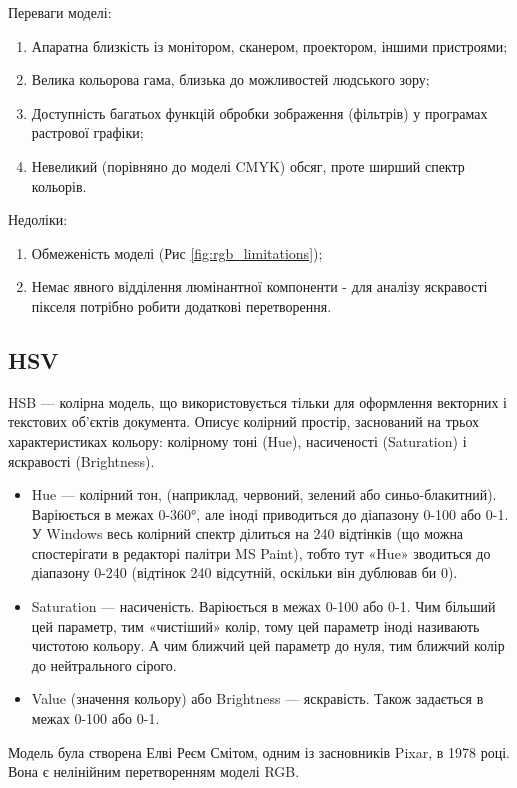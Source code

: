 Переваги моделі:
\begin{enumerate}
	\item Апаратна близкість із монітором, сканером, проектором, іншими пристроями;
	\item Велика кольорова гама, близька до можливостей людського зору;
	\item Доступність багатьох функцій обробки зображення (фільтрів) у програмах растрової графіки;
	\item Невеликий (порівняно до моделі CMYK) обсяг, проте ширший спектр кольорів.
\end{enumerate}
\bigbreak
Недоліки:
\begin{enumerate}
	\item Обмеженість моделі (Рис \ref{fig:rgb_limitations});
	\item Немає явного відділення люмінантної компоненти - для аналізу яскравості пікселя потрібно робити додаткові перетворення.
\end{enumerate}

\subsection{HSV}
HSB — колірна модель, що використовується тільки для оформлення векторних і текстових об'єктів документа. Описує колірний простір, заснований на трьох характеристиках кольору: колірному тоні (Hue), насиченості (Saturation) і яскравості (Brightness).

\begin{itemize}
	\item Hue — колірний тон, (наприклад, червоний, зелений або синьо-блакитний). Варіюється в межах 0-360°, але іноді приводиться до діапазону 0-100 або 0-1. У Windows весь колірний спектр ділиться на 240 відтінків (що можна спостерігати в редакторі палітри MS Paint), тобто тут «Hue» зводиться до діапазону 0-240 (відтінок 240 відсутній, оскільки він дублював би 0).

	\item Saturation — насиченість. Варіюється в межах 0-100 або 0-1. Чим більший цей параметр, тим «чистіший» колір, тому цей параметр іноді називають чистотою кольору. А чим ближчий цей параметр до нуля, тим ближчий колір до нейтрального сірого.
	
	\item Value (значення кольору) або Brightness — яскравість. Також задається в межах 0-100 або 0-1.
\end{itemize}

Модель була створена Елві Реєм Смітом, одним із засновників Pixar, в 1978 році. Вона є нелінійним перетворенням моделі RGB.


